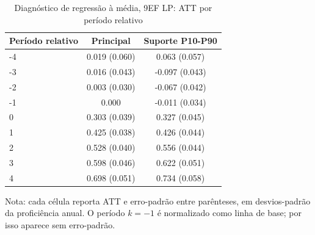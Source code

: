 \begin{table}[!htbp]
\centering
\caption{Diagnóstico de regressão à média, 9EF LP: ATT por período relativo}
\label{tab:ap_event_regmedia_9ef_lp}
\vspace{-0.15cm}
\scriptsize
\setlength{\tabcolsep}{4pt}
\renewcommand{\arraystretch}{0.92}
\begin{tabular}{lcc}
\toprule
Período relativo & Principal & Suporte P10-P90 \\
\midrule
-4 & 0.019 (0.060) & 0.063 (0.057) \\
-3 & 0.016 (0.043) & -0.097 (0.043) \\
-2 & 0.003 (0.030) & -0.067 (0.042) \\
-1 & 0.000 & -0.011 (0.034) \\
0 & 0.303 (0.039) & 0.327 (0.045) \\
1 & 0.425 (0.038) & 0.426 (0.044) \\
2 & 0.528 (0.040) & 0.556 (0.044) \\
3 & 0.598 (0.046) & 0.622 (0.051) \\
4 & 0.698 (0.051) & 0.734 (0.058) \\
\bottomrule
\end{tabular}
\begin{flushleft}
\footnotesize Nota: cada célula reporta ATT e erro-padrão entre parênteses, em desvios-padrão da proficiência anual. O período \(k=-1\) é normalizado como linha de base; por isso aparece sem erro-padrão.
\end{flushleft}
\end{table}

